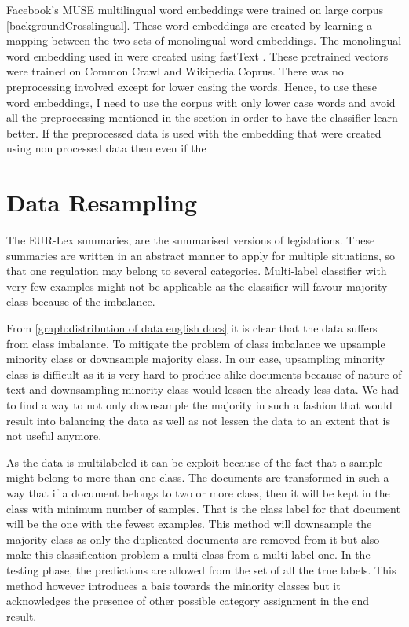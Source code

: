 Facebook's MUSE multilingual word embeddings \cite{conneau2017word} were trained on large corpus \ref{backgroundCrosslingual}. These word embeddings are created by learning a mapping between the two sets of monolingual word embeddings. The monolingual word embedding used in were created using fastText \cite{bojanowski2017enriching}. These pretrained vectors were trained on Common Crawl and Wikipedia Coprus. There was no preprocessing involved except for lower casing the words. Hence, to use these word embeddings, I need to use the corpus with only lower case words and avoid all the preprocessing mentioned in the section in order to have the classifier learn better. If the preprocessed data is used with the embedding that were created using non processed data then even if the 


\section{Data Resampling} \label{dataResampling}
The EUR-Lex summaries, are the summarised versions of legislations. These summaries are written in an abstract manner to apply for multiple situations, so that one regulation may belong to several categories. Multi-label classifier with very few examples might not be applicable as the classifier will favour majority class because of the imbalance. 

From \ref{graph:distribution of data english docs} it is clear that the data suffers from class imbalance. To mitigate the problem of class imbalance we upsample minority class or downsample majority class. In our case, upsampling minority class is difficult as it is very hard to produce alike documents because of nature of text and downsampling minority class would lessen the already less data. We had to find a way to not only downsample the majority in such a fashion that would result into balancing the data as well as not lessen the data to an extent that is not useful anymore.

As the data is multilabeled it can be exploit because of the fact that a sample might belong to more than one class. The documents are transformed in such a way that if a document belongs to two or more class, then it will be kept in the class with minimum number of samples. That is the class label for that document will be the one with the fewest examples. This method will downsample the majority class as only the duplicated documents are removed from it but also make this classification problem a multi-class from a multi-label one. In the testing phase, the predictions are allowed from the set of all the true labels. This method however introduces a bais towards the minority classes but it acknowledges the presence of other possible category assignment in the end result.

